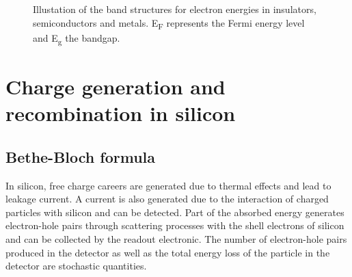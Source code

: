 \begin{figure}[htbp]
  \centering
  \caption{Illustation of the band structures for electron energies in
  insulators, semiconductors and metals. E\textsubscript{F} represents the Fermi energy level and E\textsubscript{g} the bandgap.}  
  \label{fig:energyBands}
\end{figure}

\section{Charge generation and recombination in silicon}\label{sec:chargeInSi}

\subsection{Bethe-Bloch formula}
In silicon, free charge careers are generated due to thermal effects
and lead to leakage current. A current is also generated due to the
interaction of charged particles with silicon and can be
detected. Part of the absorbed energy generates electron-hole pairs
through scattering processes with the shell electrons of silicon and
can be collected by the readout electronic. The number of
electron-hole pairs produced in the detector as well as the total
energy loss of the particle in the detector are stochastic quantities.

